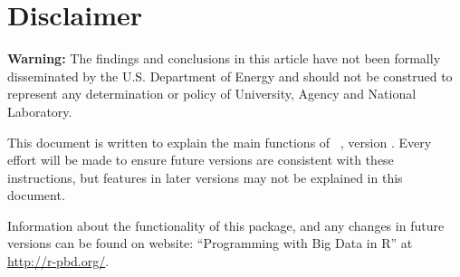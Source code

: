 \chapter*{Disclaimer}

{\color{red} \bf Warning:}
The findings and conclusions in this article have not been
formally disseminated by the U.S. Department of Energy
and should not be construed to represent any determination or
policy of University, Agency and National Laboratory.

This document is written to explain the main
functions of ~\citep{Schmidt2013pbdDEMOpackage}, version \demoversion.
Every effort will be made to ensure future versions are consistent with
these instructions, but features in later versions may not be explained
in this document.

Information about the functionality of this package,
and any changes in future versions can be found on website:
``Programming with Big Data in R'' at
\url{http://r-pbd.org/}.

